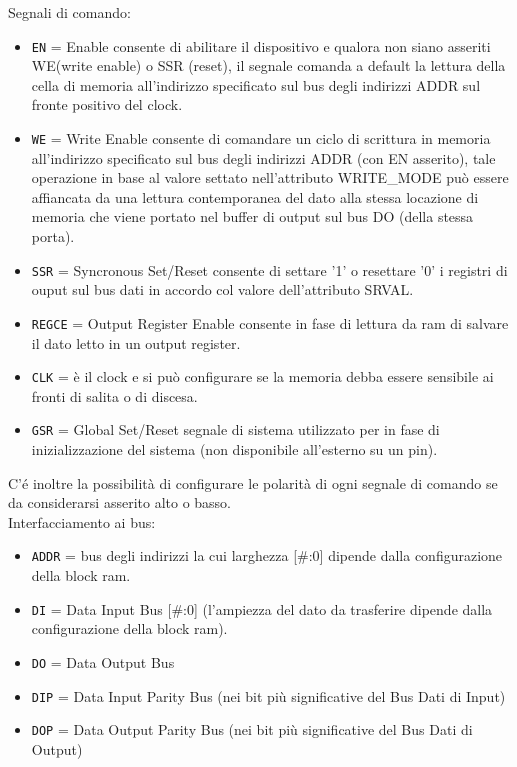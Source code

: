 Segnali di comando:

\begin{itemize}
  \item \texttt{EN} = Enable consente di abilitare il dispositivo e qualora non siano asseriti WE(write enable) o SSR (reset), il 	segnale comanda a default la lettura della cella di memoria all'indirizzo specificato sul bus degli indirizzi ADDR sul 		fronte positivo del clock.
  \item \texttt{WE} = Write Enable consente di comandare un ciclo di scrittura in memoria all'indirizzo specificato sul bus degli indirizzi ADDR (con EN asserito), tale operazione in base al valore settato nell'attributo WRITE\_MODE pu\`o essere affiancata da una lettura contemporanea del dato alla stessa locazione di memoria che viene portato nel buffer di output sul bus DO (della stessa porta). 
  \item \texttt{SSR} = Syncronous Set/Reset consente di settare '1' o resettare '0' i registri di ouput sul bus dati in accordo col valore dell'attributo SRVAL.
  \item \texttt{REGCE} = Output Register Enable consente in fase di  lettura da ram di salvare il dato letto in un output register.
  \item \texttt{CLK} =  \`e il clock e si pu\`o configurare se la memoria debba essere sensibile ai fronti di salita o di discesa.
\item \texttt{GSR} = Global Set/Reset segnale di sistema utilizzato per in fase di inizializzazione del sistema (non disponibile all'esterno su un pin).
\end{itemize}

C'\'e inoltre la possibilit\`a di configurare le polarit\`a di ogni segnale di comando se da considerarsi asserito alto o basso.
\\
Interfacciamento ai bus:\\

\begin{itemize}
  \item \texttt{ADDR} = bus degli indirizzi la cui larghezza [\#:0] dipende dalla configurazione della block ram.
  \item \texttt{DI} = Data Input Bus [\#:0] (l'ampiezza del dato da trasferire dipende dalla configurazione della block ram).
  \item \texttt{DO} = Data Output Bus
  \item \texttt{DIP} = Data Input Parity Bus (nei bit pi\`u significative del Bus Dati di Input)
  \item \texttt{DOP} = Data Output Parity Bus (nei bit pi\`u significative del Bus Dati di Output)
\end{itemize}

